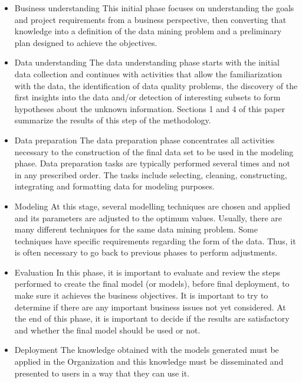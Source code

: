 \begin{itemize}
	\item Business understanding This initial phase focuses on understanding the goals and project requirements from a business perspective, then converting that knowledge into a definition of the data mining problem and a preliminary plan designed to achieve the objectives. 
	      	      	      	      	      	      	      	      
	      	      	      	      	      	      	      	        
	\item Data understanding The data understanding phase starts with the initial data collection and continues with activities that allow the familiarization with the data, the identification of data quality problems, the discovery of the first insights into the data and/or detection of interesting subsets to form hypotheses about the unknown information. Sections 1 and 4 of this paper summarize the results of this step of the methodology. 
	      	      	      	      	      	      	      	      
	\item Data preparation The data preparation phase concentrates all activities necessary to the construction of the final data set to be used in the modeling phase. Data preparation tasks are typically performed several times and not in any prescribed order. The tasks include selecting, cleaning, constructing, integrating and formatting data for modeling purposes. 
	      	      	      	      	      	      	      	      
	\item Modeling At this stage, several modelling techniques are chosen and applied and its parameters are adjusted to the optimum values. Usually, there are many different techniques for the same data mining problem. Some techniques have specific requirements regarding the form of the data. Thus, it is often necessary to go back to previous phases to perform adjustments. 
	      	      	      	      	      	      	      	      
	\item Evaluation In this phase, it is important to evaluate and review the steps performed to create the final model (or models), before final deployment, to make sure it achieves the business objectives. It is important to try to determine if there are any important business issues not yet considered. At the end of this phase, it is important to decide if the results are satisfactory and whether the final model should be used or not. 
	      	      	      	      	      	      	      	      
	\item Deployment The knowledge obtained with the models generated must be applied in the Organization and this knowledge must be disseminated and presented to users in a way that they can use it.
	      	      	      	      	      	      	      	      
\end{itemize}